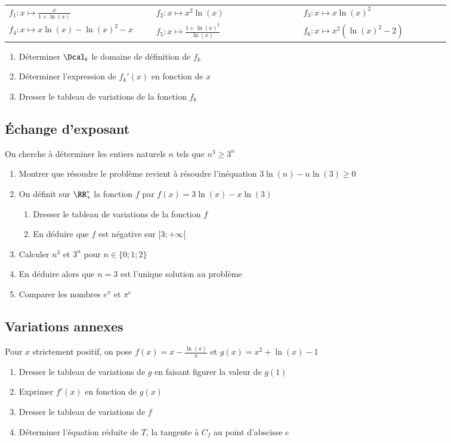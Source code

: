 \documentclass[oneside,12pt]{article}          %
\begin{document}
\renewcommand{\arraystretch}{1.5}
\begin{tabular}{p{0.3\linewidth} p{0.3\linewidth} p{0.3\linewidth}}
	$f_1:x\mapsto \frac{x}{1+\ln(x)}$ & $f_2:x\mapsto x^2\ln(x) $ & $f_3:x\mapsto x\ln(x)^2$ \\
	$f_4:x\mapsto x\ln(x)-\ln(x)^2-x$ & $f_5:x\mapsto \frac{1+\ln(x)^2}{\ln(x)}$ & $f_6:x\mapsto x^2\left(\ln(x)^2-2\right) $
\end{tabular}
\begin{enumerate}
	\item Déterminer $\Dcal_k$ le domaine de définition de $f_k$
	\item Déterminer l'expression de ${f_k}'(x)$ en fonction de $x$
	\item Dresser le tableau de variations de la fonction $f_k$
\end{enumerate}



\subsection{Échange d'exposant}
On cherche à déterminer les entiers naturels $n$ tels que $n^3\geq3^n$
\begin{enumerate}
    \item Montrer que résoudre le problème revient à résoudre l'inéquation $3\ln(n)-n\ln(3)\geq0$
    \item On définit sur $\RR_+^*$ la fonction $f$ par $f(x)=3\ln(x)-x\ln(3)$
    \begin{enumerate}
        \item Dresser le tableau de variations de la fonction $f$
        \item En déduire que $f$ est négative sur $[3;+\infty[$
    \end{enumerate}
    \item Calculer $n^3$ et $3^n$ pour $n\in\{0;1;2\}$
    \item En déduire alors que $n=3$ est l'unique solution au problème
    \item [($\star$)] Comparer les nombres $e^{\pi}$ et $\pi^e$
\end{enumerate}



\subsection{Variations annexes}
Pour $x$ strictement positif, on pose $f(x) = x - \frac{\ln(x)}{x}$ et $g(x)=x^2+\ln(x)-1$
\begin{enumerate}
    \item Dresser le tableau de variations de $g$ en faisant figurer la valeur de $g(1)$
    \item Exprimer $f'(x)$ en fonction de $g(x)$
    \item Dresser le tableau de variations de $f$
    \item Déterminer l'équation réduite de $T$, la tangente à $C_f$ au point d'abscisse $e$
\end{enumerate}
\end{document}
